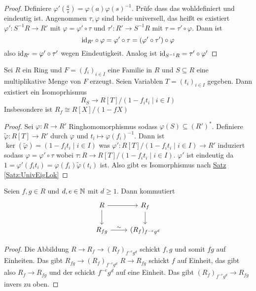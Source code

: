 \begin{proof}
    Definiere \(\varphi'(\frac a s)=\varphi(a)\varphi(s)^{-1}\). Prüfe dass das wohldefiniert und eindeutig ist. 
    Angenommen \(\tau,\varphi\) sind beide universell, das heißt es existiert \(\varphi'\colon S^{-1}R\to R'\) mit \(\varphi=\varphi'\circ\tau\) und \(\tau'\colon R'\to S^{-1}R\) mit \(\tau=\tau'\circ \varphi\).
    Dann ist 
    \[\mathrm{id}_{R'}\circ \varphi=\varphi'\circ \tau=(\varphi'\circ \tau')\circ \varphi\] also \(\mathrm{id}_{R'}=\varphi'\circ\tau'\) wegen Eindeutigkeit. Analog ist \(\mathrm{id}_{S^{-1}R}=\tau'\circ\varphi'\)
\end{proof}
\begin{Lemma}
    Sei \(R\) ein Ring und \(F=(f_i)_{i\in I}\) eine Familie in \(R\) und \(S\subseteq R\) eine multiplikative Menge von \(F\) erzeugt. Seien Variablen \(T=(t_i)_{i\in I}\) gegeben.
    Dann existiert ein Isomoprhismus 
    \[R_S\to R[T]/(1-f_it_i\mid i\in I)\]
    Insbesondere ist \(R_f\cong R[X]/(1-fX)\)
\end{Lemma}
\begin{proof}
    Sei \(\varphi:R\to R'\) Ringhomomorphismus sodass \(\varphi(S)\subseteq (R')^*\). Definiere \(\tilde\varphi\colon R[T]\to R'\) durch \(\varphi\) und \(t_i\mapsto \varphi(f_i)^{-1}\).
    Dann ist \(\ker(\tilde\varphi)=(1-f_it_i\mid i\in I)\) was \(\varphi':R[T]/(1-f_it_i\mid i\in I)\to R'\) induziert sodass \(\varphi=\varphi'\circ\tau\) wobei \(\tau:R\to R[T]/(1-f_it_i\mid i\in I)\).
    \(\varphi'\) ist eindeutig da \(1=\varphi'(f_it_i)=\varphi(f_i)\tilde\varphi(t_i)\) ist. Also gibt es Isomorphismus nach \hyperref[Satz:UnivEigLok]{Satz \ref{Satz:UnivEigLok}}
\end{proof}
\begin{Satz}\label{Satz:EigLok}
    Seien \(f,g\in R\) und \(d,e\in\mathbb{N}\) mit \(d\geq 1\). Dann kommutiert $$%
\begin{tikzcd}
R \arrow[d] \arrow[r]    & R_f \arrow[d]     \\
R_{fg} \arrow[r, "\sim"] & (R_f)_{f^{-e}g^d}
\end{tikzcd}$$
\end{Satz}
\begin{proof}
    Die Abbildung \(R\to R_f\to (R_f)_{f^{-e}g^d}\) schickt \(f,g\) und somit \(fg\) auf Einheiten. 
    Das gibt \(R_{fg}\to (R_f)_{f^{-e}g^d}\)
    \(R\to R_{fg}\) schickt \(f\) auf Einheit, das gibt also \(R_f\to R_{fg}\) und der schickt \(f^{-e}g^d\) auf eine Einheit. Das gibt \((R_f)_{f^{-e}g^d}\to R_{fg}\) invers zu oben.
\end{proof}
